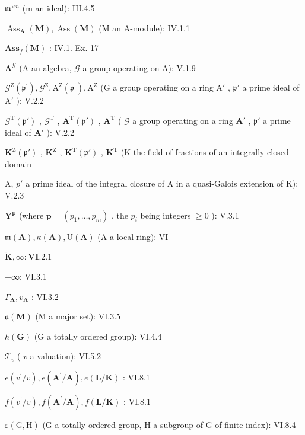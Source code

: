 \(\mathfrak{m}^{\times n}\) (m an ideal): III.4.5

\(\operatorname{Ass}_{\mathbf{A}}(\mathbf{M}), \operatorname{Ass}(\mathbf{M})\) (M an A-module): IV.1.1

\(\mathbf{Ass}_f(\mathbf{M})\) : IV.1. Ex. 17

\(\mathbf{A}^{\mathcal{G}}\) (A an algebra, \(\mathcal{G}\) a group operating on A): V.1.9

\(\mathcal{G}^{\mathrm{Z}}(\mathfrak{p}^{\prime}), \mathcal{G}^{\mathrm{Z}}, \mathrm{A}^{\mathrm{Z}}(\mathfrak{p}^{\prime}), \mathrm{A}^{\mathrm{Z}}\) (G a group operating on a ring \(\mathrm{A}'\) , \(\mathfrak{p}'\) a prime ideal of \(\mathrm{A}'\) ): V.2.2

\(\mathcal{G}^{\mathrm{T}}(\mathfrak{p}')\) , \(\mathcal{G}^{\mathrm{T}}\) , \(\mathbf{A}^{\mathrm{T}}(\mathfrak{p}')\) , \(\mathbf{A}^{\mathrm{T}}\) ( \(\mathcal{G}\) a group operating on a ring \(\mathbf{A}'\) , \(\mathfrak{p}'\) a prime ideal of \(\mathbf{A}'\) ): V.2.2

\(\mathbf{K}^{\mathrm{Z}}(\mathfrak{p}')\) , \(\mathbf{K}^{\mathrm{Z}}\) , \(\mathbf{K}^{\mathrm{T}}(\mathfrak{p}')\) , \(\mathbf{K}^{\mathrm{T}}\) (K the field of fractions of an integrally closed domain

A, \(p'\) a prime ideal of the integral closure of A in a quasi-Galois extension of K): V.2.3

\(\mathbf{Y}^{\mathbf{p}}\) (where \(\mathbf{p} = (p_1, \ldots, p_m)\) , the \(p_i\) being integers \(\geqslant 0\) ): V.3.1

\(\mathfrak{m}(\mathbf{A}), \kappa(\mathbf{A}), \mathrm{U}(\mathbf{A})\) (A a local ring): VI

\(\tilde{\mathbf{K}},\infty :\mathbf{VI}.2.1\)

+∞: VI.3.1

\(\Gamma_{\mathbf{A}}, v_{\mathbf{A}}\) : VI.3.2

\(\mathfrak{a}(\mathbf{M})\) (M a major set): VI.3.5

\(h(\mathbf{G})\) (G a totally ordered group): VI.4.4

\(\mathcal{T}_v\) ( \(v\) a valuation): VI.5.2

\(e(v^{\prime} / v), e(\mathbf{A}^{\prime} / \mathbf{A}), e(\mathbf{L} / \mathbf{K})\) : VI.8.1

\(f(v^{\prime} / v),f(\mathbf{A}^{\prime} / \mathbf{A}),f(\mathbf{L} / \mathbf{K})\) : VI.8.1

\(\varepsilon (\mathrm{G},\mathrm{H})\) (G a totally ordered group, H a subgroup of G of finite index): VI.8.4

